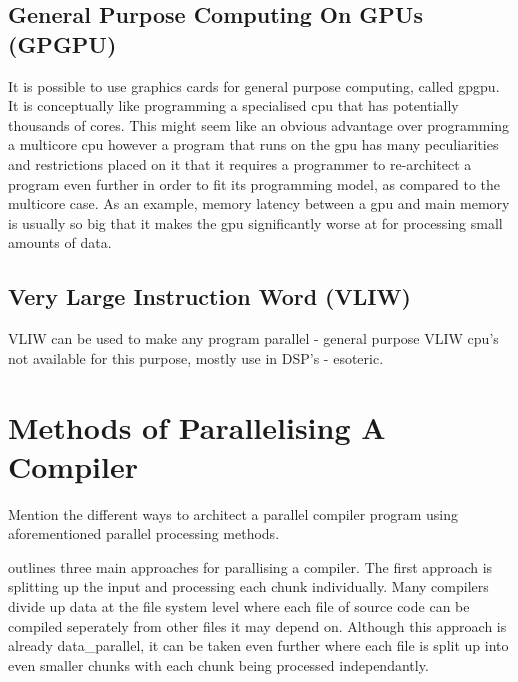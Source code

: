 \subsection{General Purpose Computing On GPUs (GPGPU)}
It is possible to use graphics cards for general purpose computing, called
\gls{gpgpu}. It is conceptually like programming a specialised \gls{cpu} that has
potentially thousands of cores. This might seem like an obvious advantage over
programming a multicore \gls{cpu} however a program that runs on the \gls{gpu} has
many peculiarities and restrictions placed on it that it requires a programmer
to re-architect a program even further in order to fit its programming model, as
compared to the multicore case. As an example, memory latency between a \gls{gpu}
and main memory is usually so big that it makes the \gls{gpu} significantly worse
at for processing small amounts of data.

\subsection{Very Large Instruction Word (VLIW)}
\begin{sectionplan}
     VLIW can be used to make any program parallel - general purpose VLIW cpu's
not available for this purpose, mostly use in DSP's - esoteric.
\end{sectionplan}
\cite{fisher_parallel_2004}

\section{Methods of Parallelising A Compiler} \label{compiler_parallel_methods}
\begin{sectionplan}
    Mention the different ways to architect a parallel compiler program using
aforementioned parallel processing methods.
\cite{hillis_data_1986, gross_parallel_1989, jena_design_2018, baer_model_1977}
\end{sectionplan}

\cite{gross_parallel_1989} outlines three main approaches for parallising a
compiler. The first approach is splitting up the input and processing each chunk
individually. Many compilers divide up data at the file system level where each
file of source code can be compiled seperately from other files it may depend
on. Although this approach is already \gls{data_parallel}, it can be taken even
further where each file is split up into even smaller chunks with each chunk
being processed independantly.

